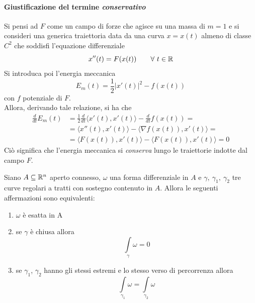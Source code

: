 \paragraph{Giustificazione del termine \textit{conservativo}}
Si pensi ad $F$ come un campo di forze che agisce su una massa di $m=1$ e si consideri una generica traiettoria data da una curva $x=x(t)$ almeno di classe $C^2$ che soddisfi l'equazione differenziale 
\begin{equation}
    x''(t)=F(x(t)) \qquad \forall\ t \in \mathbb{R}
\end{equation}
Si introduca poi l'energia meccanica 
\begin{equation}
    E_m(t)= \frac{1}{2} |x'(t)|^2- f(x(t))
\end{equation}
con $f$ potenziale di $F$.\\
Allora, derivando tale relazione, si ha che
\begin{equation}
\begin{aligned}
        \frac{d}{dt}{E_m(t)}&=\frac{1}{2} \frac{d}{dt}{ \langle x'(t), x'(t) \rangle}- \frac{d}{dt}{f(x(t))}=\\
        &= \langle x''(t), x'(t) \rangle- \langle \nabla f(x(t)), x'(t) \rangle =\\
        &= \langle F(x(t)), x'(t) \rangle - \langle F(x(t)), x'(t) \rangle =0
\end{aligned}    
\end{equation}
Ciò significa che l'energia meccanica si \textit{conserva} lungo le traiettorie indotte dal campo $F$.
\begin{theorem} \label{Teo: Caratterizzazione forme esatte}
Siano $A \subseteq \mathbb{R}^n$ aperto connesso, $\omega$ una forma differenziale in $A$ e $\gamma,\ \gamma_1,\ \gamma_2$ tre curve regolari a tratti con sostegno contenuto in $A$. Allora le seguenti affermazioni sono equivalenti:
\begin{enumerate}
    \item $\omega$ è esatta in A
    \item se $\gamma$ è chiusa allora 
    \begin{equation}
        \int\limits_{\gamma}{\omega}=0
    \end{equation}
    \item se $\gamma_1$, $\gamma_2$ hanno gli stessi estremi e lo stesso verso di percorrenza allora
    \begin{equation}
        \int\limits_{\gamma_1}{\omega} = \int\limits_{\gamma_2}{\omega}
    \end{equation}
\end{enumerate}
\end{theorem}
